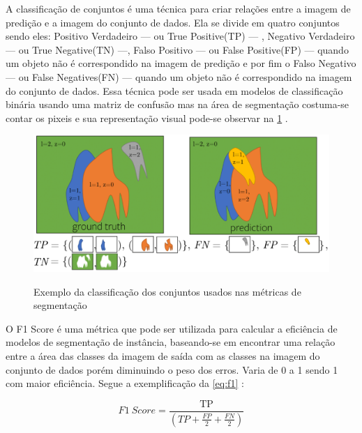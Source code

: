 A classificação de conjuntos é uma técnica para criar relações entre a imagem de predição e a imagem do conjunto de dados. Ela se divide em quatro conjuntos sendo eles: Positivo Verdadeiro — ou True Positive(TP) —
, Negativo Verdadeiro — ou True Negative(TN) —, Falso Positivo — ou False Positive(FP) — quando um objeto não é correspondido na imagem de predição e por fim o Falso Negativo — ou False Negatives(FN) — quando um objeto não é correspondido na imagem do conjunto de dados. Essa técnica pode ser usada em modelos de classificação binária usando uma matriz de confusão mas na área de segmentação costuma-se contar os pixeis e sua representação visual pode-se observar na \cref{fig:conjuntos} \space\cite{kirillov2019panoptic, Wang2020}.
\begin{figure}[ht]
	\caption{Exemplo da classificação dos conjuntos usados nas métricas de segmentação}
	\centering %
	\includegraphics[width=15cm]{figures/pan_metric.png} %
	\label{fig:conjuntos}
\end{figure}



O F1 Score é uma métrica que pode ser utilizada para calcular a eficiência de modelos de segmentação de instância,  baseando-se em encontrar uma relação entre a área das classes da imagem de saída com as classes na imagem do conjunto de dados porém diminuindo o peso dos erros. Varia de 0 a 1 sendo 1 com maior eficiência. Segue a exemplificação da \cref{eq:f1} \space\cite{Chicco2020}:

\begin{equation}
	\label{eq:f1}
	F1\ Score = \frac{\text{TP}}{(TP + \frac{FP}{2} + \frac{FN}{2} )}
\end{equation}

